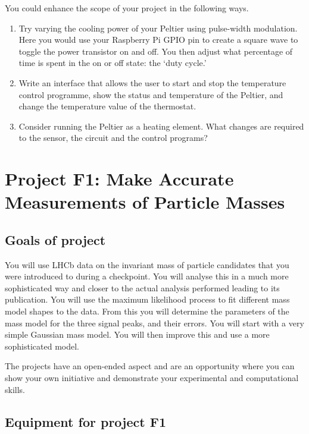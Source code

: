 You could enhance the scope of your project in the following ways.
\begin{enumerate}
	\item Try varying the cooling power of your Peltier using pulse-width modulation.
		Here you would use your Raspberry Pi GPIO pin to create a square wave to toggle the power transistor on and off.
		You then adjust what percentage of time is spent in the on or off state: the `duty cycle.'
	\item Write an interface that allows the user to start and stop the temperature control programme, show the status and temperature of the Peltier, and change the temperature value of the thermostat.
	\item Consider running the Peltier as a heating element. What changes are required to the sensor, the circuit and the control programs?
\end{enumerate}


 
 
 
\newpage
\section{Project F1: Make Accurate Measurements of Particle Masses}

\subsection{Goals of project}

You will use LHCb data on the invariant mass of particle candidates that you were introduced to during a checkpoint. You will analyse this in a much more sophisticated way and closer to the actual analysis performed leading to its publication. You will use the maximum likelihood process to fit different mass model shapes to the data. From this you will determine the parameters of the mass model for the three signal peaks, and their errors. You will start with a very simple Gaussian mass model. You will then improve this and use a more sophisticated model.

The projects have an open-ended aspect and are an opportunity where you can show your own initiative and demonstrate your experimental and computational skills. 

\subsection{Equipment for project F1}

